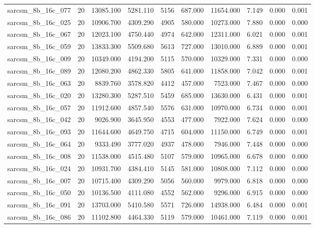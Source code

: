 \begin{tabular}{lrrrrrrrrr}
sarcsm\_8b\_16c\_077 & 20 & 13085.100 & 5281.110 & 5156 & 687.000 & 11654.000 & 7.149 & 0.000 & 0.001 \\
sarcsm\_8b\_16c\_025 & 20 & 10906.700 & 4309.290 & 4905 & 580.000 & 10273.000 & 7.880 & 0.000 & 0.000 \\
sarcsm\_8b\_16c\_067 & 20 & 12023.100 & 4750.440 & 4974 & 642.000 & 12311.000 & 6.021 & 0.000 & 0.001 \\
sarcsm\_8b\_16c\_059 & 20 & 13833.300 & 5509.680 & 5613 & 727.000 & 13010.000 & 6.889 & 0.000 & 0.001 \\
sarcsm\_8b\_16c\_009 & 20 & 10349.000 & 4194.200 & 5115 & 570.000 & 10329.000 & 7.331 & 0.000 & 0.000 \\
sarcsm\_8b\_16c\_089 & 20 & 12080.200 & 4862.330 & 5805 & 641.000 & 11858.000 & 7.042 & 0.000 & 0.001 \\
sarcsm\_8b\_16c\_063 & 20 & 8839.760 & 3578.820 & 4412 & 457.000 & 7523.000 & 7.467 & 0.000 & 0.000 \\
sarcsm\_8b\_16c\_020 & 20 & 13280.300 & 5287.510 & 5459 & 685.000 & 13630.000 & 6.431 & 0.000 & 0.001 \\
sarcsm\_8b\_16c\_057 & 20 & 11912.600 & 4857.540 & 5576 & 631.000 & 10970.000 & 6.734 & 0.000 & 0.001 \\
sarcsm\_8b\_16c\_042 & 20 & 9026.900 & 3645.950 & 4553 & 477.000 & 7922.000 & 7.624 & 0.000 & 0.000 \\
sarcsm\_8b\_16c\_093 & 20 & 11644.600 & 4649.750 & 4715 & 604.000 & 11150.000 & 6.749 & 0.000 & 0.001 \\
sarcsm\_8b\_16c\_064 & 20 & 9333.490 & 3777.020 & 4937 & 478.000 & 7946.000 & 7.448 & 0.000 & 0.000 \\
sarcsm\_8b\_16c\_008 & 20 & 11538.000 & 4515.480 & 5107 & 579.000 & 10965.000 & 6.678 & 0.000 & 0.000 \\
sarcsm\_8b\_16c\_024 & 20 & 10931.700 & 4384.410 & 5145 & 581.000 & 10808.000 & 7.112 & 0.000 & 0.000 \\
sarcsm\_8b\_16c\_007 & 20 & 10715.400 & 4309.290 & 5056 & 560.000 & 9979.000 & 6.818 & 0.000 & 0.000 \\
sarcsm\_8b\_16c\_050 & 20 & 10136.500 & 4111.080 & 4552 & 562.000 & 9296.000 & 6.915 & 0.000 & 0.000 \\
sarcsm\_8b\_16c\_091 & 20 & 13703.000 & 5410.580 & 5571 & 726.000 & 14938.000 & 6.484 & 0.000 & 0.001 \\
sarcsm\_8b\_16c\_086 & 20 & 11102.800 & 4464.330 & 5119 & 579.000 & 10461.000 & 7.119 & 0.000 & 0.001 \\

\end{tabular}
